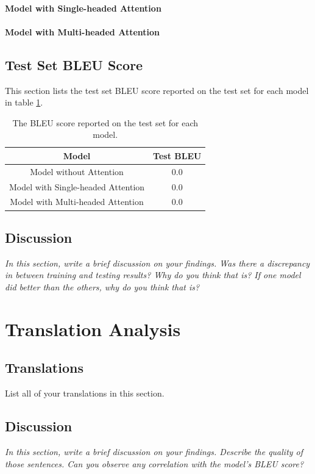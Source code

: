 \documentclass[11pt]{article}
\begin{document}
\paragraph{Model with Single-headed Attention}


\paragraph{Model with Multi-headed Attention}


\subsection{Test Set BLEU Score}
This section lists the test set BLEU score reported on the test set for each model in table \ref{tab:bleu}.
\begin{table}[h]
\centering
\begin{tabular}{|c|c|} \hline
Model                              & Test BLEU \\ \hline
Model without Attention            & 0.0       \\ \hline
Model with Single-headed Attention & 0.0       \\ \hline
Model with Multi-headed Attention  & 0.0       \\ \hline
\end{tabular}
\caption{The BLEU score reported on the test set for each model.}
\label{tab:bleu}
\end{table}

\subsection{Discussion}

{\it In this section, write a brief discussion on your findings. Was there a discrepancy in between training and testing results? Why do you think that is? If one model did better than the others, why do you think that is?}

\section{Translation Analysis}

\subsection{Translations}

List all of your translations in this section.

\subsection{Discussion}
{\it In this section, write a brief discussion on your findings. Describe the quality of
those sentences. Can you observe any correlation with the model’s BLEU score?}
\end{document}

